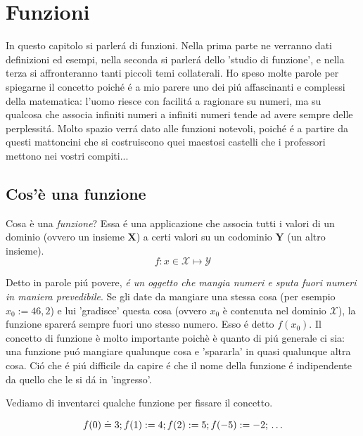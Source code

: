 \label{funzioni}
\chapter{Funzioni}

In questo capitolo si parler\'a di funzioni. Nella prima parte ne verranno dati definizioni ed esempi, 
nella seconda si parler\'a dello 'studio di funzione', e nella terza si affronteranno tanti piccoli temi
collaterali. Ho speso molte parole per spiegarne il concetto poich\'e \'e a mio parere uno dei pi\'u 
affascinanti e complessi della matematica: l'uomo riesce con facilit\'a a ragionare su numeri, ma su qualcosa
che associa infiniti numeri a infiniti numeri tende ad avere sempre delle perplessit\'a. Molto spazio verr\'a
dato alle funzioni notevoli, poich\'e \'e a partire da questi mattoncini che si costruiscono quei maestosi
castelli che i professori mettono nei vostri compiti...


\section{Cos'è una funzione}

Cosa è una {\em funzione}? Essa \'e una applicazione che associa tutti 
i valori di un dominio (ovvero un insieme $\mathbf{X}$) a certi valori su un 
codominio $\mathbf{Y}$ (un altro insieme).
\begin{equation}
f: x \in \mathcal{X} \mapsto \mathcal{Y}
\end{equation}

Detto in parole pi\'u povere, {\em \'e un oggetto 
che mangia numeri e sputa fuori numeri in maniera prevedibile}. Se gli date da 
mangiare una stessa cosa (per esempio $x_0:=46,2$) e lui 'gradisce' questa 
cosa (ovvero $x_0$ è contenuta nel dominio $\mathcal{X}$), la funzione 
sparer\'a sempre fuori uno stesso numero. Esso \'e detto $f(x_0)$. Il concetto di funzione
è molto importante poichè è quanto di pi\'u generale ci sia: una funzione pu\'o 
mangiare qualunque cosa e 'spararla' in quasi qualunque altra cosa. Ci\'o che \'e pi\'u
difficile da capire \'e che il nome della funzione \'e indipendente da quello che le 
si d\'a in 'ingresso'.

Vediamo di inventarci qualche funzione per fissare il concetto.

\begin{equation}
 f(0) \doteq 3; \\
 f(1):=4; \\ 
 f(2):=5; \\ 
 f(-5):=-2; \\ 
  \ldots
\end{equation}

